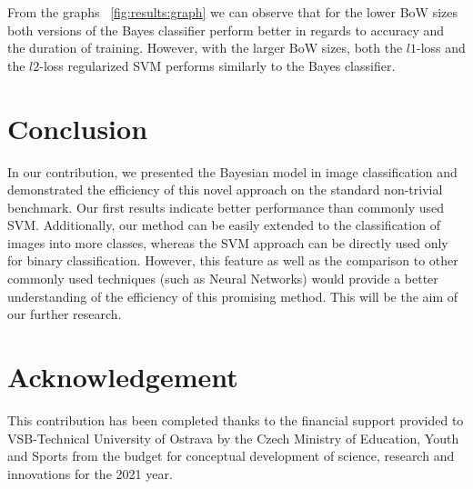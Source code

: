 \documentclass{aip-cp}
\newcommand{\figref}[1]{\figurename~\ref{#1}}
\begin{document}
From the graphs \figref{fig:results:graph} we can observe that for the lower BoW sizes both versions of the Bayes classifier perform better in regards to accuracy and the duration of training. However, with the larger BoW sizes, both the $l1$-loss and the $l2$-loss regularized SVM performs similarly to the Bayes classifier.

\section{Conclusion}
In our contribution, we presented the Bayesian model in image classification and demonstrated the efficiency of this novel approach on the standard non-trivial benchmark. Our first results indicate better performance than commonly used SVM. Additionally, our method can be easily extended to the classification of images into more classes, whereas the SVM approach can be directly used only for binary classification. However, this feature as well as the comparison to other commonly used techniques (such as Neural Networks) would provide a better understanding of the efficiency of this promising method. This will be the aim of our further research.

\section{Acknowledgement}
This contribution has been completed thanks to the financial support provided to VSB-Technical University of Ostrava by the Czech Ministry of Education, Youth and Sports from the budget for conceptual development of science, research and innovations for the 2021 year.



\end{document}
